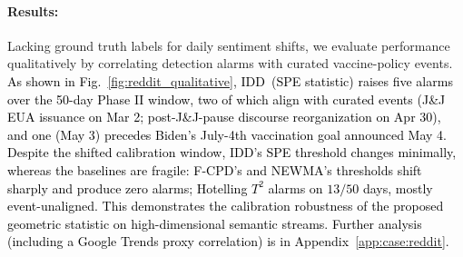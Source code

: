 \documentclass{article}
\newcommand{\algoname}{\textsc{IDD}\xspace}
\newcommand{\rev}[1]{\textcolor{black}{#1}}
\theoremstyle{plain}
\theoremstyle{definition}
\theoremstyle{remark}
\begin{document}
\paragraph{Results:}
Lacking ground truth labels for daily sentiment shifts, we evaluate performance qualitatively by correlating detection alarms with curated vaccine-policy events.
\rev{As shown in Fig.~\ref{fig:reddit_qualitative}, \algoname\ (SPE statistic) raises five alarms over the 50-day Phase II window, two of which align with curated events (J\&J EUA issuance on Mar 2; post-J\&J-pause discourse reorganization on Apr 30), and one (May 3) precedes Biden's July-4th vaccination goal announced May 4.}
\rev{Despite the shifted calibration window, \algoname's SPE threshold changes minimally, whereas the  baselines are fragile: F-CPD's and NEWMA's thresholds shift sharply and produce zero alarms; Hotelling $T^2$ alarms on $13/50$ days, mostly event-unaligned. This demonstrates the calibration robustness of the proposed geometric statistic on high-dimensional semantic streams. Further analysis (including a Google Trends proxy correlation) is in Appendix~\ref{app:case:reddit}.}




\end{document}
